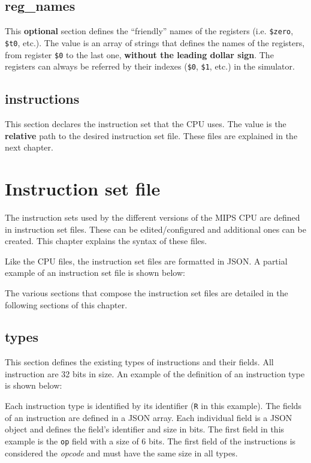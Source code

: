 \documentclass[11pt,a4paper,twoside,titlepage]{report}
\begin{document}
\section{reg\_names}

This \textbf{optional} section defines the ``friendly'' names of the registers (i.e.
\verb+$zero+, \verb+$t0+, etc.).
The value is an array of strings that defines the names of the registers, from
register \verb+$0+ to the last one, \textbf{without the leading dollar sign}.
The registers can always be referred by their indexes (\verb+$0+, \verb+$1+, etc.) 
in the simulator.


\section{instructions}

This section declares the instruction set that the CPU uses.
The value is the \textbf{relative} path to the desired instruction set file.
These files are explained in the next chapter.


\chapter{Instruction set file} \label{ch:set}

The instruction sets used by the different versions of the MIPS CPU
are defined in instruction set files.
These can be edited/configured and additional ones can be created.
This chapter explains the syntax of these files.

Like the CPU files, the instruction set files are formatted in JSON.
A partial example of an instruction set file is shown below:



The various sections that compose the instruction set files are detailed in 
the following sections of this chapter.


\section{types}

This section defines the existing types of instructions and their fields.
All instruction are 32 bits in size.
An example of the definition of an instruction type is shown below:



Each instruction type is identified by its identifier (\verb+R+ in this example).
The fields of an instruction are defined in a JSON array. Each individual field is 
a JSON object and defines the field's identifier and size in bits. The first field
in this example is the \verb+op+ field with a size of 6 bits.
The first field of the instructions is considered the \emph{opcode} and must
have the same size in all types.
\end{document}
